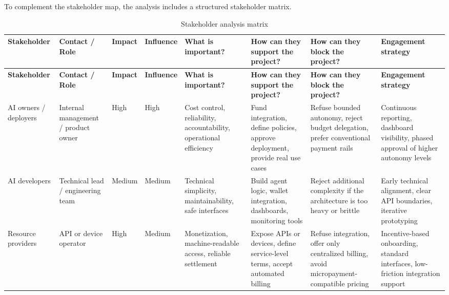 \documentclass[12pt,a4paper,oneside]{article}
\theoremstyle{definition}
\theoremstyle{plain}
\begin{document}
To complement the stakeholder map, the analysis includes a structured stakeholder matrix.

\begin{landscape}

\footnotesize
\setlength{\extrarowheight}{2pt}
\setlength{\tabcolsep}{4pt}

\begin{longtable}{p{3.0cm}p{3.2cm}p{1.2cm}p{1.3cm}p{3.6cm}p{3.6cm}p{3.6cm}p{3.8cm}}
\caption{Stakeholder analysis matrix}
\label{tab:stakeholdermatrix}\\
\toprule
\textbf{Stakeholder} &
\textbf{Contact / Role} &
\textbf{Impact} &
\textbf{Influence} &
\textbf{What is important?} &
\textbf{How can they support the project?} &
\textbf{How can they block the project?} &
\textbf{Engagement strategy} \\
\midrule
\endfirsthead

\toprule
\textbf{Stakeholder} &
\textbf{Contact / Role} &
\textbf{Impact} &
\textbf{Influence} &
\textbf{What is important?} &
\textbf{How can they support the project?} &
\textbf{How can they block the project?} &
\textbf{Engagement strategy} \\
\midrule
\endhead

AI owners / deployers &
Internal management / product owner &
High &
High &
Cost control, reliability, accountability, operational efficiency &
Fund integration, define policies, approve deployment, provide real use cases &
Refuse bounded autonomy, reject budget delegation, prefer conventional payment rails &
Continuous reporting, dashboard visibility, phased approval of higher autonomy levels \\

AI developers &
Technical lead / engineering team &
Medium &
Medium &
Technical simplicity, maintainability, safe interfaces &
Build agent logic, wallet integration, dashboards, monitoring tools &
Reject additional complexity if the architecture is too heavy or brittle &
Early technical alignment, clear API boundaries, iterative prototyping \\

Resource providers &
API or device operator &
High &
Medium &
Monetization, machine-readable access, reliable settlement &
Expose APIs or devices, define service-level terms, accept automated billing &
Refuse integration, offer only centralized billing, avoid micropayment-compatible pricing &
Incentive-based onboarding, standard interfaces, low-friction integration support \\


\end{longtable}
\end{landscape}
\end{document}
